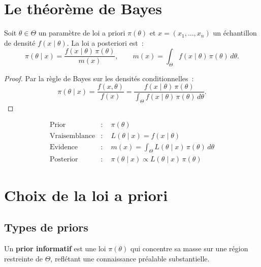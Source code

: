 \section{Le th\'eor\`eme de Bayes}

\begin{theoreme}
\label{thm:bayes}
Soit $\theta \in \Theta$ un param\`etre de loi a priori $\pi(\theta)$
et $x = (x_1, \ldots, x_n)$ un \'echantillon de densit\'e
$f(x \mid \theta)$. La loi a posteriori est~:
\[
  \pi(\theta \mid x)
  = \frac{f(x \mid \theta)\,\pi(\theta)}{m(x)},
  \qquad
  m(x) = \int_\Theta f(x \mid \theta)\,\pi(\theta)\,d\theta.
\]
\end{theoreme}

\begin{proof}
Par la r\`egle de Bayes sur les densit\'es conditionnelles~:
\[
  \pi(\theta \mid x)
  = \frac{f(x, \theta)}{f(x)}
  = \frac{f(x \mid \theta)\,\pi(\theta)}
         {\int_\Theta f(x \mid \theta)\,\pi(\theta)\,d\theta}.
\]
\end{proof}

\begin{formules}[title=\textbf{Composantes du th\'eor\`eme de Bayes}]
\begin{align*}
  \text{Prior} &: \quad \pi(\theta) \\
  \text{Vraisemblance} &: \quad L(\theta \mid x) = f(x \mid \theta) \\
  \text{Evidence} &: \quad m(x) = \int_\Theta L(\theta \mid x)\,\pi(\theta)\,d\theta \\
  \text{Posterior} &: \quad \pi(\theta \mid x) \propto L(\theta \mid x)\,\pi(\theta)
\end{align*}
\end{formules}

\section{Choix de la loi a priori}

\subsection{Types de priors}

\begin{definition}
Un \textbf{prior informatif} est une loi $\pi(\theta)$ qui concentre
sa masse sur une r\'egion restreinte de $\Theta$, refl\'etant une
connaissance pr\'ealable substantielle.
\end{definition}


